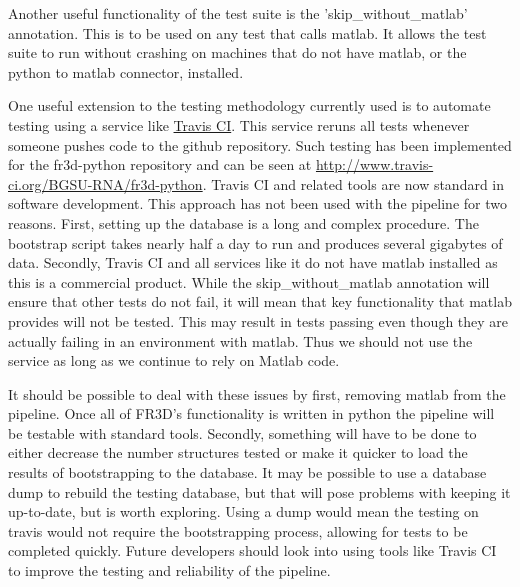 Another useful functionality of the test suite is the 'skip\_without\_matlab'
annotation. This is to be used on any test that calls matlab. It allows the test
suite to run without crashing on machines that do not have matlab, or the python
to matlab connector, installed.

One useful extension to the testing methodology currently used is to automate
testing using a service like \href{https://travis-ci.org/}{Travis CI}. This
service reruns all tests whenever someone pushes code to the github repository.
Such testing has been implemented for the fr3d-python repository and can be seen
at \url{http://www.travis-ci.org/BGSU-RNA/fr3d-python}. Travis CI and related tools
are now standard in software development. This approach has not been used with
the pipeline for two reasons. First, setting up the database is a long and
complex procedure. The bootstrap script takes nearly half a day to run and
produces several gigabytes of data. Secondly, Travis CI and all services like it
do not have matlab installed as this is a commercial product. While the
skip\_without\_matlab annotation will ensure that other tests do not fail, it will
mean that key functionality that matlab provides will not be tested. This may
result in tests passing even though they are actually failing in an environment
with matlab. Thus we should not use the service as long as we continue to rely
on Matlab code.

It should be possible to deal with these issues by first, removing matlab from
the pipeline. Once all of FR3D's functionality is written in python the pipeline
will be testable with standard tools. Secondly, something will have to be done
to either decrease the number structures tested or make it quicker to load the
results of bootstrapping to the database. It may be possible to use a database
dump to rebuild the testing database, but that will pose problems with keeping
it up-to-date, but is worth exploring. Using a dump would mean the testing on
travis would not require the bootstrapping process, allowing for tests to be
completed quickly. Future developers should look into using tools like Travis CI
to improve the testing and reliability of the pipeline.
